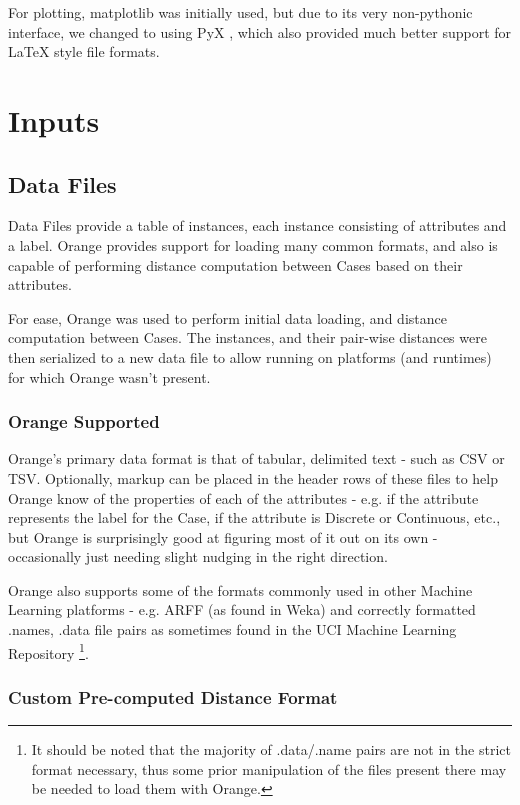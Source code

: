 \documentclass[a4paper,11pt]{report}
\begin{document}
For plotting, matplotlib \citep{prog:matplotlib} was initially used, but due to its very non-pythonic interface, we changed to using PyX \citep{prog:pyx}, which also provided much better support for \LaTeX{} style file formats.

\section{Inputs}
\subsection{Data Files}
Data Files provide a table of instances, each instance consisting of attributes and a label. Orange provides support for loading many common formats, and also is capable of performing distance computation between Cases based on their attributes.

For ease, Orange was used to perform initial data loading, and distance computation between Cases. The instances, and their pair-wise distances were then serialized to a new data file to allow running on platforms (and runtimes) for which Orange wasn't present.

\subsubsection{Orange Supported}
Orange's primary data format is that of tabular, delimited text - such as CSV or TSV. Optionally, markup can be placed in the header rows of these files to help Orange know of the properties of each of the attributes - e.g. if the attribute represents the label for the Case, if the attribute is Discrete or Continuous, etc., but Orange is surprisingly good at figuring most of it out on its own - occasionally just needing slight nudging in the right direction.

Orange also supports some of the formats commonly used in other Machine Learning platforms - e.g. ARFF (as found in Weka) and correctly formatted .names, .data file pairs as sometimes found in the UCI Machine Learning Repository \citep{web:uci}\footnote{It should be noted that the majority of .data/.name pairs are not in the strict format necessary, thus some prior manipulation of the files present there may be needed to load them with Orange.}.

\subsubsection{Custom Pre-computed Distance Format}
\end{document}
